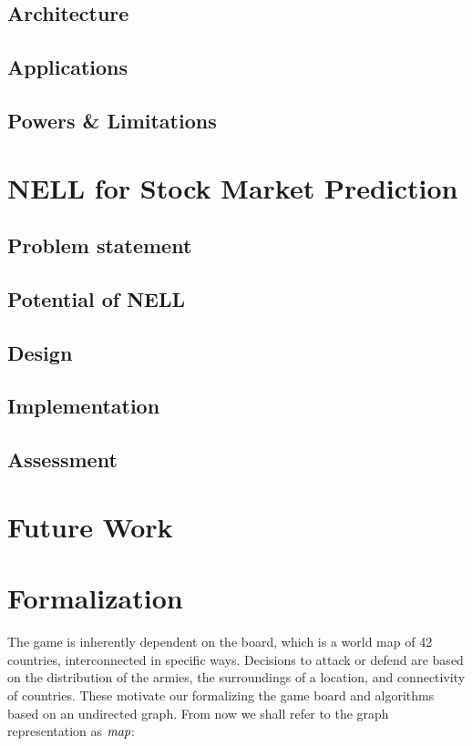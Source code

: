 \documentclass[12pt]{article}  %
\begin{document}
\subsection{Architecture}
\subsection{Applications}
\subsection{Powers \& Limitations}



\section{NELL for Stock Market Prediction}

\subsection{Problem statement}
\subsection{Potential of NELL}
\subsection{Design}
\subsection{Implementation}
\subsection{Assessment}


\section{Future Work}





\section{Formalization} \label{formalization}

The game is inherently dependent on the board, which is a world map of 42 countries, interconnected in specific ways. Decisions to attack or defend are based on the distribution of the armies, the surroundings of a location, and connectivity of countries. These motivate our formalizing the game board and algorithms based on an undirected graph. From now we shall refer to the graph representation as $\emph{map}$:
\end{document}
